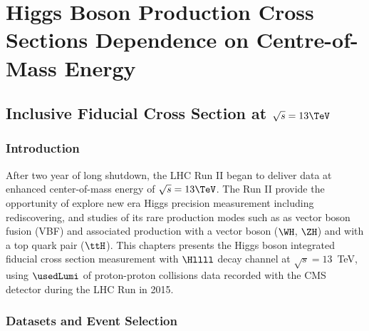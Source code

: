 \chapter{Higgs Boson Production Cross Sections Dependence on Centre-of-Mass Energy}\label{Chapter6}
\section{Inclusive Fiducial Cross Section at $\sqrt{s}=13 \TeV$}
\subsection{Introduction}
After two year of long shutdown, the LHC Run II began to deliver data at enhanced center-of-mass energy of $\sqrt{s}=13 \TeV$. The Run II 
provide the opportunity of explore new era Higgs precision measurement including rediscovering, and studies of its rare production modes such as
as vector boson fusion (VBF) and associated production with a vector boson ($\WH$, $\ZH$) and with a top quark pair ($\ttH$). 
This chapters presents the  Higgs boson integrated fiducial cross section measurement with $\Hllll$ decay channel at $\sqrt{s}=13$~TeV, using
$\usedLumi$ of proton-proton  collisions data recorded with the CMS  detector during the LHC Run in 2015.
\subsection{Datasets and Event Selection}

